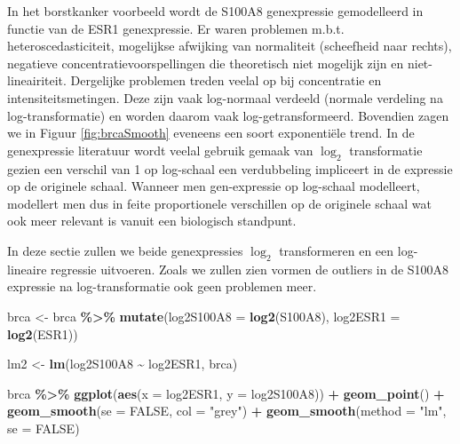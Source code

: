 \documentclass[
  12pt,dutch,coursenotes]{book}
\newenvironment{Shaded}{\begin{snugshade}}{\end{snugshade}}
\newcommand{\DataTypeTok}[1]{\textcolor[rgb]{0.13,0.29,0.53}{#1}}
\newcommand{\KeywordTok}[1]{\textcolor[rgb]{0.13,0.29,0.53}{\textbf{#1}}}
\newcommand{\NormalTok}[1]{#1}
\newcommand{\OperatorTok}[1]{\textcolor[rgb]{0.81,0.36,0.00}{\textbf{#1}}}
\newcommand{\OtherTok}[1]{\textcolor[rgb]{0.56,0.35,0.01}{#1}}
\newcommand{\StringTok}[1]{\textcolor[rgb]{0.31,0.60,0.02}{#1}}
\theoremstyle{definition}
\theoremstyle{definition}
\theoremstyle{definition}
\theoremstyle{remark}
\begin{document}
In het borstkanker voorbeeld wordt de S100A8 genexpressie gemodelleerd in functie van de ESR1 genexpressie. Er waren problemen m.b.t. heteroscedasticiteit, mogelijkse afwijking van normaliteit (scheefheid naar rechts), negatieve concentratievoorspellingen die theoretisch niet mogelijk zijn en niet-lineairiteit. Dergelijke problemen treden veelal op bij concentratie en intensiteitsmetingen. Deze zijn vaak log-normaal verdeeld (normale verdeling na log-transformatie) en worden daarom vaak log-getransformeerd.
Bovendien zagen we in Figuur \ref{fig:brcaSmooth} eveneens een soort exponentiële trend.
In de genexpressie literatuur wordt veelal gebruik gemaak van \(\log_2\) transformatie gezien een verschil van 1 op log-schaal een verdubbeling impliceert in de expressie op de originele schaal.
Wanneer men gen-expressie op log-schaal modelleert, modellert men dus in feite proportionele verschillen op de originele schaal wat ook meer relevant is vanuit een biologisch standpunt.

In deze sectie zullen we beide genexpressies \(\log_2\) transformeren en een log-lineaire regressie uitvoeren. Zoals we zullen zien vormen de outliers in de S100A8 expressie na log-transformatie ook geen problemen meer.

\begin{Shaded}
\begin{Highlighting}[]
\NormalTok{brca \textless{}{-}}\StringTok{ }\NormalTok{brca }\OperatorTok{\%\textgreater{}\%}\StringTok{ }\KeywordTok{mutate}\NormalTok{(}\DataTypeTok{log2S100A8 =} \KeywordTok{log2}\NormalTok{(S100A8), }
    \DataTypeTok{log2ESR1 =} \KeywordTok{log2}\NormalTok{(ESR1))}

\NormalTok{lm2 \textless{}{-}}\StringTok{ }\KeywordTok{lm}\NormalTok{(log2S100A8 }\OperatorTok{\textasciitilde{}}\StringTok{ }\NormalTok{log2ESR1, brca)}

\NormalTok{brca }\OperatorTok{\%\textgreater{}\%}\StringTok{ }\KeywordTok{ggplot}\NormalTok{(}\KeywordTok{aes}\NormalTok{(}\DataTypeTok{x =}\NormalTok{ log2ESR1, }\DataTypeTok{y =}\NormalTok{ log2S100A8)) }\OperatorTok{+}\StringTok{ }
\StringTok{    }\KeywordTok{geom\_point}\NormalTok{() }\OperatorTok{+}\StringTok{ }\KeywordTok{geom\_smooth}\NormalTok{(}\DataTypeTok{se =} \OtherTok{FALSE}\NormalTok{, }\DataTypeTok{col =} \StringTok{"grey"}\NormalTok{) }\OperatorTok{+}\StringTok{ }
\StringTok{    }\KeywordTok{geom\_smooth}\NormalTok{(}\DataTypeTok{method =} \StringTok{"lm"}\NormalTok{, }\DataTypeTok{se =} \OtherTok{FALSE}\NormalTok{)}
\end{Highlighting}
\end{Shaded}
\end{document}
